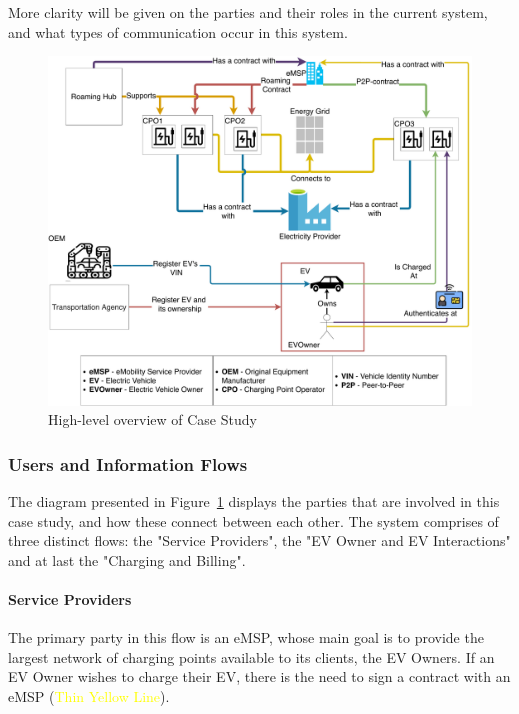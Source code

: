 More clarity will be given on the parties and their roles in the current system, and what types of communication occur in this system.

\begin{figure}[!htb]
    \centering
    \includegraphics[width=0.85\linewidth]{images/Initial_model.pdf}
    \caption{High-level overview of Case Study}
    \label{fig:High-level overview}
\end{figure}

\subsubsection{Users and Information Flows}
\label{subsubsec:users_and_information_flows}

The diagram presented in Figure~\ref{fig:High-level overview} displays the parties that are involved in this case study, and how these connect between each other. The system comprises of three distinct flows: the "Service Providers", the "EV Owner and EV Interactions" and at last the "Charging and Billing".

\paragraph{Service Providers}

The primary party in this flow is an \acrfull{eMSP}, whose main goal is to provide the largest network of charging points available to its clients, the \glspl{EV Owner}. If an EV Owner wishes to charge their EV, there is the need to sign a contract with an eMSP (\textcolor{yellow}{Thin Yellow Line}).

